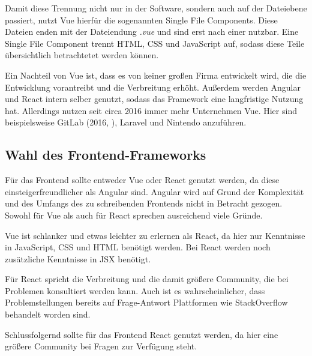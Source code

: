 Damit diese Trennung nicht nur in der Software, sondern auch auf der Dateiebene passiert, nutzt Vue hierfür die sogenannten Single File Components. Diese Dateien enden mit der Dateiendung \textit{.vue} und sind erst nach einer  nutzbar. Eine Single File Component trennt HTML, CSS und JavaScript auf, sodass diese Teile übersichtlich betrachtetet werden können. \cite{teufelVueJsTutorial2018a}

Ein Nachteil von Vue ist, dass es von keiner großen Firma entwickelt wird, die die Entwicklung vorantreibt und die Verbreitung erhöht. Außerdem werden Angular und React intern selber genutzt, sodass das Framework eine langfristige Nutzung hat. Allerdings nutzen seit circa 2016 immer mehr Unternehmen Vue. Hier sind beispielsweise GitLab (2016, \cite{schatzWhyWeChose2016}), Laravel und Nintendo anzuführen. \cite{techuzTopWebsitesBuilt2018}

\subsection{Wahl des Frontend-Frameworks}

Für das Frontend sollte entweder Vue oder React genutzt werden, da diese einsteigerfreundlicher als Angular sind. Angular wird auf Grund der Komplexität und des Umfangs des zu schreibenden Frontends nicht in Betracht gezogen. Sowohl für Vue als auch für React \linebreak sprechen ausreichend viele Gründe.

Vue ist schlanker und etwas leichter zu erlernen als React, da hier nur Kenntnisse in \linebreak JavaScript, CSS und HTML benötigt werden. Bei React werden noch zusätzliche Kenntnisse in JSX benötigt.

Für React spricht die Verbreitung und die damit größere Community, die bei Problemen konsultiert werden kann. Auch ist es wahrscheinlicher, dass Problemstellungen bereits auf Frage-Antwort Plattformen wie StackOverflow behandelt worden sind. 

Schlussfolgernd sollte für das Frontend React genutzt werden, da hier eine größere \linebreak Community bei Fragen zur Verfügung steht.

